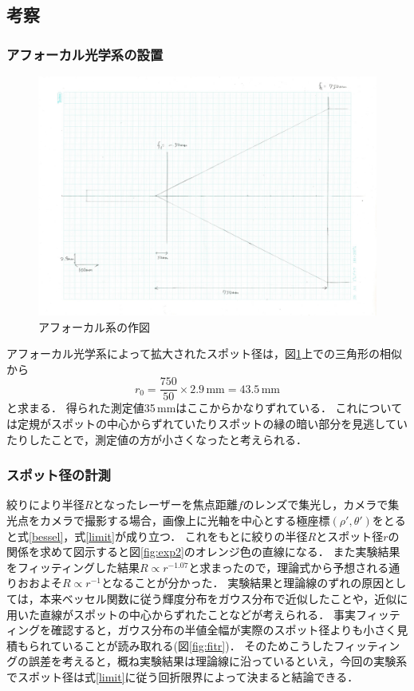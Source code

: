 \documentclass[titlepage]{jsarticle}
\begin{document}
\subsection{考察}
\subsubsection{アフォーカル光学系の設置}

\begin{figure}[htbp]
    \centering
    \includegraphics[width=15cm]{afforcal_fig.jpg}
    \caption{アフォーカル系の作図}
    \label{fig:afforcal}
\end{figure}

アフォーカル光学系によって拡大されたスポット径は，図\ref{fig:afforcal}上での三角形の相似から
\begin{equation}
    r_0 = \frac{750}{50} \times 2.9\,\mathrm{mm} = 43.5\,\mathrm{mm}
\end{equation}
と求まる．
得られた測定値35\,mmはここからかなりずれている．
これについては定規がスポットの中心からずれていたりスポットの縁の暗い部分を見逃していたりしたことで，測定値の方が小さくなったと考えられる．

\subsubsection{スポット径の計測}
絞りにより半径$R$となったレーザーを焦点距離$f$のレンズで集光し，カメラで集光点をカメラで撮影する場合，画像上に光軸を中心とする極座標$(\rho',\theta')$をとると式\eqref{bessel}，式\eqref{limit}が成り立つ．
これをもとに絞りの半径$R$とスポット径$r$の関係を求めて図示すると図\ref{fig:exp2}のオレンジ色の直線になる．
また実験結果をフィッティングした結果$R\propto r^{-1.07}$と求まったので，理論式から予想される通りおおよそ$R \propto r^{-1}$となることが分かった．
実験結果と理論線のずれの原因としては，本来ベッセル関数に従う輝度分布をガウス分布で近似したことや，近似に用いた直線がスポットの中心からずれたことなどが考えられる．
事実フィッティングを確認すると，ガウス分布の半値全幅が実際のスポット径よりも小さく見積もられていることが読み取れる(図\ref{fig:fitr})．
そのためこうしたフィッティングの誤差を考えると，概ね実験結果は理論線に沿っているといえ，今回の実験系でスポット径は式\eqref{limit}に従う回折限界によって決まると結論できる．
\end{document}
